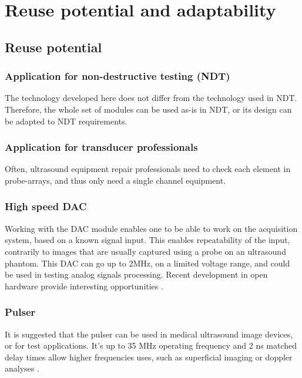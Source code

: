 \documentclass[letterpaper, 10 pt, conference]{ieeeconf} %
\begin{document}
\section{Reuse potential and adaptability} 

\subsection{Reuse potential}

\subsubsection{Application for non-destructive testing (NDT)} 

The technology developed here does not differ from the technology used in NDT. Therefore, the whole set of modules can be used as-is in NDT, or its design can be adapted to NDT requirements.

\subsubsection{Application for transducer professionals} 

Often, ultrasound equipment repair professionals need to check each element in probe-arrays, and thus only need a single channel equipment.  

\subsubsection{High speed DAC}

Working with the DAC module enables one to be able to work on the acquisition system, based on a known signal input. This enables repeatability of the input, contrarily to images that are usually captured using a probe on an ultrasound phantom. This DAC can go up to 2MHz, on a limited voltage range, and could be used in testing analog signals processing. Recent development in open hardware provide interesting opportunities  \cite{c23}.

\subsubsection{Pulser}

It is suggested that the pulser can be used in medical ultrasound image devices, or for test applications. It's up to 35 MHz operating frequency and 2 ns matched delay times allow higher frequencies uses, such as superficial imaging or doppler analyses \cite{c1}.
\end{document}
